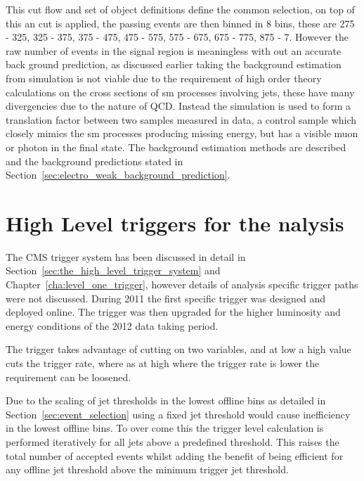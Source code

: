 This cut flow and set of object definitions define the common selection, on top 
of this an \alt cut is applied, the passing events are then binned in 8 \HT 
bins, these are \unit{275}{\GeV} - \unit{325}{\GeV}, \unit{325}{\GeV} - 
\unit{375}{\GeV}, \unit{375}{\GeV} - \unit{475}{\GeV}, \unit{475}{\GeV} - 
\unit{575}{\GeV}, \unit{575}{\GeV} - \unit{675}{\GeV}, \unit{675}{\GeV} - 
\unit{775}{\GeV}, \unit{875}{\GeV} - \unit{7}{\TeV}.
However the raw number of events in the signal region is meaningless with out 
an accurate back ground prediction, as discussed earlier taking the background 
estimation from simulation is not viable due to the requirement of high order 
theory calculations on the cross sections of \ac{sm} processes involving 
jets, these have many divergencies due to the nature of QCD. Instead the 
simulation is used to form a translation factor between two samples measured in 
data, a control sample which closely mimics the \ac{sm} processes 
producing missing energy, but has a visible muon or photon in the final state. 
The background estimation methods are described and the background predictions 
stated in Section~\ref{sec:electro_weak_background_prediction}.


\section{High Level triggers for the \texorpdfstring{\alt} analysis} %
\label{sec:high_level_triggers_for_the_alt_analysis}
The CMS trigger system has been discussed in detail in 
Section~\ref{sec:the_high_level_trigger_system} and 
Chapter~\ref{cha:level_one_trigger}, however details of analysis specific 
trigger paths were not discussed. During 2011 the first \alt specific trigger 
was designed and deployed online. The trigger was then upgraded for the higher 
luminosity and energy conditions of the 2012 data taking period.


The trigger takes advantage of cutting on two variables, \HT and \alt at low 
\HT a high \alt value cuts the trigger rate, where as at high \HT where the
trigger rate is lower the \alt requirement can be loosened.

Due to the scaling of jet thresholds in the lowest offline \HT bins as detailed 
in Section~\ref{sec:event_selection} using a fixed jet threshold would cause 
inefficiency in the lowest offline \HT bins. To over come this the trigger 
level \alt calculation is performed iteratively for all jets above a predefined 
threshold. This raises the total number of accepted events whilst adding the 
benefit of being efficient for any offline jet threshold above the minimum 
trigger jet threshold.

